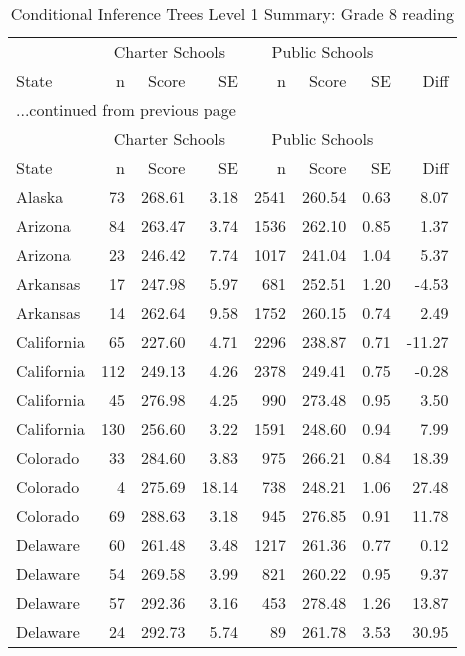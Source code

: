 \begin{longtable}{lrrr@{\extracolsep{10pt}}rrrr}
\caption{Conditional Inference Trees Level 1 Summary: Grade 8 reading} \\ 
  \hline
  & \multicolumn{3}{c}{Charter Schools} & \multicolumn{3}{c}{Public Schools} & \\ \cline{2-4} \cline{5-7} State & n & Score & SE & n & Score & SE & Diff \\ \endfirsthead \multicolumn{8}{l}{{...continued from previous page}}\\ \hline & \multicolumn{3}{c}{Charter Schools} & \multicolumn{3}{c}{Public Schools} & \\ \cline{2-4} \cline{5-7} State & n & Score & SE & n & Score & SE & Diff \\ \hline \endhead \hline \endfoot \endlastfoot \hline
Alaska &  73 & 268.61 & 3.18 & 2541 & 260.54 & 0.63 & 8.07 \\ 
  Arizona &  84 & 263.47 & 3.74 & 1536 & 262.10 & 0.85 & 1.37 \\ 
  Arizona &  23 & 246.42 & 7.74 & 1017 & 241.04 & 1.04 & 5.37 \\ 
  Arkansas &  17 & 247.98 & 5.97 & 681 & 252.51 & 1.20 & -4.53 \\ 
  Arkansas &  14 & 262.64 & 9.58 & 1752 & 260.15 & 0.74 & 2.49 \\ 
  California &  65 & 227.60 & 4.71 & 2296 & 238.87 & 0.71 & -11.27 \\ 
  California & 112 & 249.13 & 4.26 & 2378 & 249.41 & 0.75 & -0.28 \\ 
  California &  45 & 276.98 & 4.25 & 990 & 273.48 & 0.95 & 3.50 \\ 
  California & 130 & 256.60 & 3.22 & 1591 & 248.60 & 0.94 & 7.99 \\ 
  Colorado &  33 & 284.60 & 3.83 & 975 & 266.21 & 0.84 & 18.39 \\ 
  Colorado &   4 & 275.69 & 18.14 & 738 & 248.21 & 1.06 & 27.48 \\ 
  Colorado &  69 & 288.63 & 3.18 & 945 & 276.85 & 0.91 & 11.78 \\ 
  Delaware &  60 & 261.48 & 3.48 & 1217 & 261.36 & 0.77 & 0.12 \\ 
  Delaware &  54 & 269.58 & 3.99 & 821 & 260.22 & 0.95 & 9.37 \\ 
  Delaware &  57 & 292.36 & 3.16 & 453 & 278.48 & 1.26 & 13.87 \\ 
  Delaware &  24 & 292.73 & 5.74 &  89 & 261.78 & 3.53 & 30.95 \\ 

\end{longtable}
